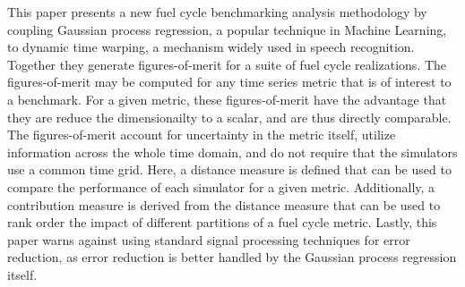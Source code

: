 This paper presents a new fuel cycle benchmarking analysis methodology
by coupling Gaussian process regression, a popular technique in Machine 
Learning, to dynamic time warping, a mechanism widely used in speech 
recognition. Together they generate figures-of-merit for a suite of fuel 
cycle realizations. The figures-of-merit may be computed for any time 
series metric that is of interest to a benchmark. For a given metric, 
these figures-of-merit have the advantage that they are reduce the 
dimensionailty to a scalar, and are thus directly comparable. 
The figures-of-merit
account for uncertainty in the metric itself, utilize information
across the whole time domain, and do not require that the simulators
use a common time grid. Here, a distance measure is defined that can be used 
to compare the performance of each simulator for a given metric. Additionally, 
a contribution measure is derived from the distance measure that can be used 
to rank order the impact of different partitions of a fuel cycle metric. 
Lastly, this paper 
warns against using standard signal processing techniques for error reduction,
as error reduction is better handled by the Gaussian process regression 
itself.
